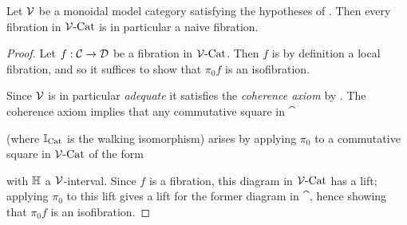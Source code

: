 \documentclass[12pt]{amsart}
\begin{document}
\begin{lemma}\label{lem:fibrations-are-naive}
	Let $\mathcal{V}$ be a monoidal model category satisfying the hypotheses of \cite[Theorem 1.10]{BergerMoerdijk2012}. 
	Then every fibration in $\mathcal{V}\text{-}\mathrm{Cat}$ is in particular a naive fibration.
\end{lemma}
\begin{proof}
	Let $f: \mathcal{C} \to \mathcal{D}$ be a fibration in $\mathcal{V}\text{-}\mathrm{Cat}$. Then $f$ is by definition a local fibration, and so it suffices to show that $\pi_0 f$ is an isofibration. 
	\par Since $\mathcal{V}$ is in particular \textit{adequate} \cite[Definition 1.1]{BergerMoerdijk2012} it satisfies the \textit{coherence axiom} \cite[Definition 2.19]{BergerMoerdijk2012} by \cite[Lemma 2.23]{BergerMoerdijk2012}. 
	The coherence axiom implies that any commutative square in $\cat$
	\begin{center}
	\end{center}
	(where $\mathbb{I}_\mathrm{Cat}$ is the walking isomorphism) arises by applying $\pi_0$ to a commutative square in $\mathcal{V}\text{-}\mathrm{Cat}$ of the form
	\begin{center}
	\end{center}
	with $\mathbb{H}$ a $\mathcal{V}$-interval. 
	Since $f$ is a fibration, this diagram in $\mathcal{V}\text{-}\mathrm{Cat}$ has a lift; applying $\pi_0$ to this lift gives a lift for the former diagram in $\cat$, hence showing that $\pi_0 f$ is an isofibration.
\end{proof}
\end{document}
